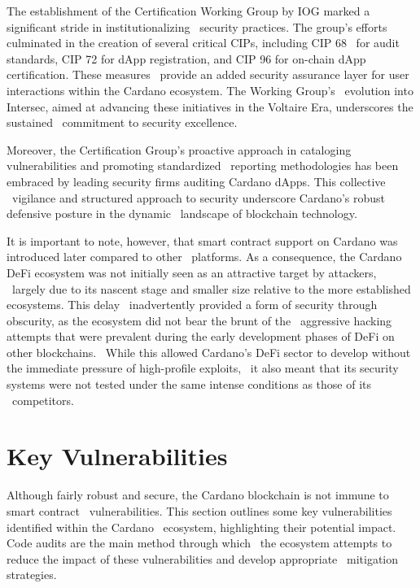 \documentclass{scrreport}
\begin{document}
The establishment of the Certification Working Group by IOG marked a significant stride in institutionalizing \
security practices. The group's efforts culminated in the creation of several critical CIPs, including CIP 68 \
for audit standards, CIP 72 for dApp registration, and CIP 96 for on-chain dApp certification. These measures \
provide an added security assurance layer for user interactions within the Cardano ecosystem. The Working Group's \
evolution into Intersec, aimed at advancing these initiatives in the Voltaire Era, underscores the sustained \
commitment to security excellence.

Moreover, the Certification Group's proactive approach in cataloging vulnerabilities and promoting standardized \
reporting methodologies has been embraced by leading security firms auditing Cardano dApps. This collective \
vigilance and structured approach to security underscore Cardano's robust defensive posture in the dynamic \
landscape of blockchain technology.

It is important to note, however, that smart contract support on Cardano was introduced later compared to other \
platforms. As a consequence, the Cardano DeFi ecosystem was not initially seen as an attractive target by attackers, \
largely due to its nascent stage and smaller size relative to the more established ecosystems. This delay \
inadvertently provided a form of security through obscurity, as the ecosystem did not bear the brunt of the \
aggressive hacking attempts that were prevalent during the early development phases of DeFi on other blockchains. \
While this allowed Cardano's DeFi sector to develop without the immediate pressure of high-profile exploits, \
it also meant that its security systems were not tested under the same intense conditions as those of its \
competitors.

\section{Key Vulnerabilities}
Although fairly robust and secure, the Cardano blockchain is not immune to smart contract \
vulnerabilities. This section outlines some key vulnerabilities identified within the Cardano \
ecosystem, highlighting their potential impact. Code audits are the main method through which \
the ecosystem attempts to reduce the impact of these vulnerabilities and develop appropriate \
mitigation strategies.
\end{document}
